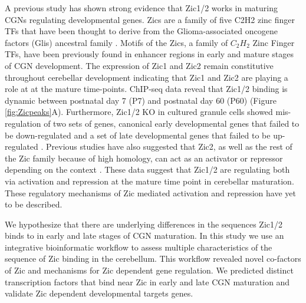 \documentclass[fleqn,10pt]{wlscirep}
\begin{document}
A previous study has shown strong evidence that Zic1/2 works in maturing CGNs regulating developmental genes. Zics are a family of five C2H2 zinc finger TFs that have been thought to derive from the Glioma-associated oncogene factors (Glis) ancestral family \cite{Tohmonda2018IdentificationProteins, Ishiguro2018LinkExpression}. Motifs of the Zics, a family of $C_2H_2$ Zinc Finger TFs, have been previously found in enhancer regions in early and mature stages of CGN development. The expression of Zic1 and Zic2 remain constitutive throughout cerebellar development indicating that Zic1 and Zic2 are playing a role at at the mature time-points. ChIP-seq data reveal that Zic1/2 binding is dynamic between postnatal day 7 (P7) and postnatal day 60 (P60) (Figure \ref{fig:Zicpeaks}A). Furthermore, Zic1/2 KO in cultured granule cells showed mis-regulation of two sets of genes, canonical early developmental genes that failed to be down-regulated and a set of late developmental genes that failed to be up-regulated \cite{Frank2015RegulationCerebellum}. Previous studies have also suggested that Zic2, as well as the rest of the Zic family because of high homology, can act as an activator or repressor depending on the context \cite{Ishiguro2018LinkExpression, Himeda2013Pax3Enhancer, Luo2015Zic2Specification, Hatayama2018RoleRemodeling.}. These data suggest that Zic1/2 are regulating both via activation and repression at the mature time point in cerebellar maturation. These regulatory mechanisms of Zic mediated activation and repression have yet to be described.
 
We hypothesize that there are underlying differences in the sequences Zic1/2 binds to in early and late stages of CGN maturation. In this study we use an integrative bioinformatic workflow to assess multiple characteristics of the sequence of Zic binding in the cerebellum.  This workflow revealed novel co-factors of Zic and mechanisms for Zic dependent gene regulation. We predicted distinct transcription factors that bind near Zic in early and late CGN maturation and validate Zic dependent developmental targets genes.
\end{document}
